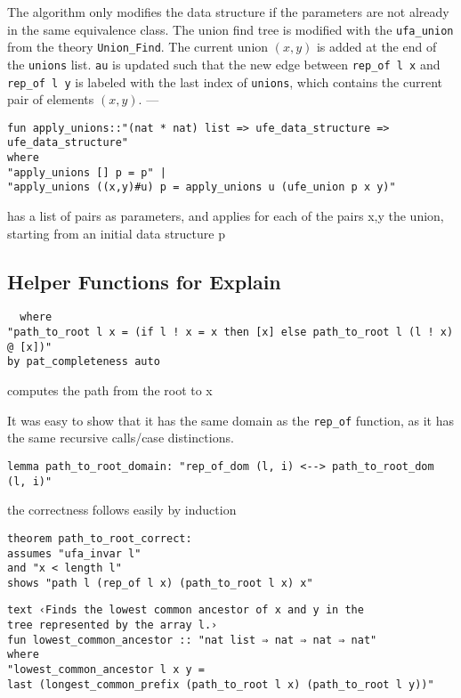 The algorithm only modifies the data structure if the parameters are not already in the same equivalence class.
The union find tree is modified with the \lstinline{ufa_union} from the theory \lstinline{Union_Find}\cite{Sep}.
The current union $(x, y)$ is added at the end of the \lstinline{unions} list.
\lstinline{au} is updated such that the new edge between \lstinline{rep_of l x} and \lstinline{rep_of l y} is labeled with the last index of \lstinline{unions}, which contains the current pair of elements $(x, y)$. 
---
\begin{lstlisting}
fun apply_unions::"(nat * nat) list => ufe_data_structure => ufe_data_structure"
where
"apply_unions [] p = p" |
"apply_unions ((x,y)#u) p = apply_unions u (ufe_union p x y)"
\end{lstlisting}

has a list of pairs as parameters, and applies for each of the pairs x,y the union, starting from an initial data structure p


\subsection{Helper Functions for Explain}

\begin{lstlisting}
  where 
"path_to_root l x = (if l ! x = x then [x] else path_to_root l (l ! x) @ [x])"
by pat_completeness auto
\end{lstlisting}

computes the path from the root to x

It was easy to show that it has the same domain as the \lstinline{rep_of} function, as it has the same recursive calls/case distinctions.

\begin{lstlisting}
lemma path_to_root_domain: "rep_of_dom (l, i) <--> path_to_root_dom (l, i)" 
\end{lstlisting}

the correctness follows easily by induction

\begin{lstlisting}
theorem path_to_root_correct:
assumes "ufa_invar l"
and "x < length l"
shows "path l (rep_of l x) (path_to_root l x) x"
\end{lstlisting}

\begin{lstlisting}
text ‹Finds the lowest common ancestor of x and y in the
tree represented by the array l.›
fun lowest_common_ancestor :: "nat list ⇒ nat ⇒ nat ⇒ nat" 
where
"lowest_common_ancestor l x y = 
last (longest_common_prefix (path_to_root l x) (path_to_root l y))"
\end{lstlisting}

